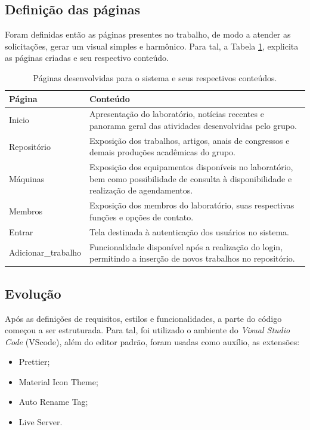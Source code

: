 \subsection{Definição das páginas}
Foram definidas então as páginas presentes no trabalho, de modo a atender as solicitações, gerar um visual simples e harmônico. Para tal, a Tabela \ref{tab:paginas}, explicita as páginas criadas e seu respectivo conteúdo. 
\begin{table}[H]
	\centering
	\caption{Páginas desenvolvidas para o sistema e seus respectivos conteúdos.}
	\label{tab:paginas}
	\renewcommand{\arraystretch}{1.4}
	\begin{tabularx}{\textwidth}{>{\raggedright\arraybackslash}p{} X}
		\hline
		\textbf{Página} & \textbf{Conteúdo} \\
		\hline
		Inicio & Apresentação do laboratório, notícias recentes e panorama geral das atividades desenvolvidas pelo grupo. \\[2pt]
		
		Repositório & Exposição dos trabalhos, artigos, anais de congressos e demais produções acadêmicas do grupo. \\[2pt]
		
		Máquinas & Exposição dos equipamentos disponíveis no laboratório, bem como possibilidade de consulta à disponibilidade e realização de agendamentos. \\[2pt]
		
		Membros & Exposição dos membros do laboratório, suas respectivas funções e opções de contato. \\[2pt]
		
		Entrar & Tela destinada à autenticação dos usuários no sistema. \\[2pt]
		
		Adicionar\_trabalho & Funcionalidade disponível após a realização do login, permitindo a inserção de novos trabalhos no repositório. \\
		\hline
	\end{tabularx}
\end{table}

\vspace{5mm}
\subsection{Evolução}
Após as definições de requisitos, estilos e funcionalidades, a parte do código começou a ser estruturada. Para tal, foi utilizado o ambiente do \textit{Visual Studio Code} (VScode), além do editor padrão, foram usadas como auxílio, as extensões:
\begin{itemize}
	\item Prettier;
	\item Material Icon Theme;
	\item Auto Rename Tag;
	\item Live Server.
\end{itemize}

